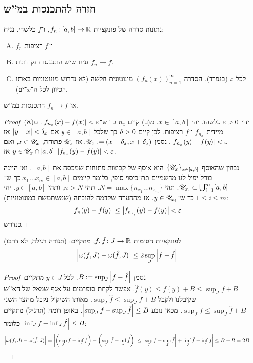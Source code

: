 \documentclass[]{../../../../tex/classes/styledArticle}
\begin{document}
	\subsection*{חזרה להתכנסות במ''ש}
	\begin{Theorem}
		נתונות סדרה של פונקציות $f_n \colon [a, b] \to \mathbb{R}$, ו־$f$ כלשהי. נניח: 
		\begin{enumerate}[(A)]
			\item $f_n$ ו־$f$ רציפות
			\item נניח שיש התכנסות נקודתית $f_n \to f$. 
			\item לכל $x$ (בנפרד), הסדרה $(f_n(x))_{n = 1}^{\infty}$ מונוטונית חלשה (לא נדרוש מונוטוניות באותו הכיוון לכל ה־$x$־ים). 
		\end{enumerate}
		אז $f_n \to f$ התכנסות במ''ש. 
	\end{Theorem}
	\begin{proof}
		יהי $\eg > 0$ כלשהו. יהי $x \in [a, b]$. מ(ב) קיים $n_x$ כך ש־$\sof{f_{n_x}(x) - f(x)} < \eg$. מ(א) מיידית $f_{n_x}$ ו־$f$ רציפות. לכן קיים $\delta > 0$ כך שלכל $y \in [a, b]$ אם $\left \lvert y - x \right \rvert  < \delta_x$ אז $\sof{f_{n_x}(y) - f(y)} < \eg$. נסמן $\mathscr{U}_x := (x -\delta_x, x + \delta_x)$. אז $\mathscr{U}_x$ פתוחה, $x \in \mathscr{U}_x$, ואם $y \in \mathscr{U}_x \cap [a, b]$ אז $\sof{f_{n_x}(y) - f(y)} < \eg$. 
		
		נבחין שהאוסף $\{\mathscr{U}_x\}_{x \in [a, b]}$ הוא אוסף של קבוצות פתוחות שמכסה את $[a, b]$. ואז היינה בורל יפיל לנו מהשמיים תת־כיסוי סופי, כלומר קיימים $x_1 \dots x_m \in [a, b]$ כך ש־$\mathscr{U}_{x_i} \subset \bigcup_{i = 1}^{m}[a, b]$. תהי $N = \max\{n_{x_1} \dots n_{x_m}\}$. תהי $n > N$, ותהי $y \in [a, b]$. יהי $1 \le i \le m$ כך ש־$y \in \mathscr{U}_{x_i}$. אז מההערה שקדמה להוכחה (שמשתמשת במונוטוניות): 
		\[ \sof{f_n(y) - f(y)} \le \sof{f_{n_{x_i}}(y) - f(y)} < \eg \]
		כנדרש. 
	\end{proof}
	
	\begin{Lemma}
		לפונקציות חסומות $f, \hat f \colon J \to \mathbb{R}$, מתקיים: (תנודה רגילה, לא דרבו)
		\[ \left \lvert \omega(f, J) - \omega(\hat f, J) \right \rvert \le 2 \sup_J \left \lvert f - \hat f \right \rvert \]
	\end{Lemma}\begin{proof}
		נסמן $B := \sup_J\left \lvert f - \hat f \right \rvert$. לכל $y \in J$ מתקיים $\hat f(y) \le f(y) + B \le \sup_J f + B$. אפשר לקחת סופרמום על אגף שמאל של הא''ש שקיבלנו ולקבל $\sup_J \hat f \le \sup_J f + B$. מאותו השיקול נקבל מהצד השני $\sup_J f \le \sup_J \hat f + B$. מכאן נובע $\left \lvert \sup_J f - \sup _J \hat f \right \rvert \le B$. באופן דומה (תרגיל) מתקיים $\left \lvert \inf_J f - \inf_J \hat f \right \rvert \le B$ כלומר: 
		\[ \left \lvert \omega(f, J) - \omega(\hat f, J) \right \rvert = \left \lvert \left ( \sup_Jf - \inf_Jf \right ) - \left ( \sup_J \hat f - \inf_J \hat f \right ) \right \rvert \le \left \lvert \sup_J f - \sup_J \hat f \right \rvert + \left \lvert \inf_j \hat f - \inf_J f \right \rvert \le B + B = 2B \]\envendproof
	\end{proof}
	
\end{document}
